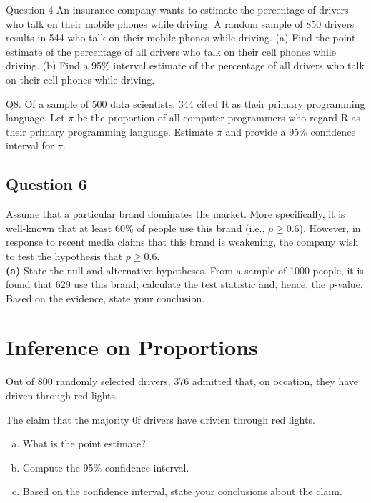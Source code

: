 \documentclass[]{report}
\begin{document}
Question 4
An insurance company wants to estimate the percentage of drivers who talk on their mobile phones while driving. 
A random sample of 850 drivers results in 544 who talk on their mobile phones while driving.
(a) Find the point estimate of the percentage of all drivers who talk on their cell phones while driving.
(b) Find a 95\% interval estimate of the percentage of all drivers who talk on their cell phones while driving. 



Q8. Of a sample of 500 data scientists, 344 cited R as their primary programming language. 
Let $\pi$ be the proportion of all computer programmers who regard R as their primary programming 
language. Estimate $\pi$ and provide a 95\% confidence interval for $\pi$.



\subsection*{Question 6}
Assume that a particular brand dominates the market. More specifically, it is well-known that at least 60\% of people use this brand (i.e., $p \ge 0.6$). However, in response to recent media claims that this brand is weakening, the company wish to test the hypothesis that $p \ge 0.6$. \\[-0.2cm]

{\bf(a)} State the null and alternative hypotheses.  From a sample of 1000 people, it is found that 629 use this brand; calculate the test statistic and, hence, the p-value.  Based on the evidence, state your conclusion.


\section{Inference on Proportions}

Out of 800 randomly selected drivers, 376 admitted that, on occation, they have driven through red lights.

The claim that the majority 0f drivers have drivien through red lights.
\begin{enumerate}[(a)]
\item What is the point estimate? 
\item Compute the 95\% confidence interval. 
\item Based on the confidence interval, state your conclusions about the claim.
\end{enumerate}
\end{document}

